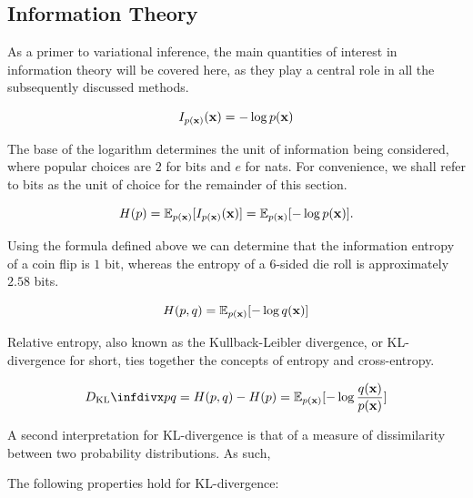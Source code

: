 \subsection{Information Theory}

As a primer to variational inference, the main quantities of interest in information theory will be covered here, as they play a central role in all the subsequently discussed methods.



$$I_{p(\mathbf{x})}(\mathbf{x}) = -\log p(\mathbf{x})$$

The base of the logarithm determines the unit of information being considered, where popular choices are $2$ for bits and $e$ for nats. For convenience, we shall refer to bits as the unit of choice for the remainder of this section.


$$H(p) = \mathbb{E}_{p(\mathbf{x})}[I_{p(\mathbf{x})}(\mathbf{x})] = \mathbb{E}_{p(\mathbf{x})}[-\log p(\mathbf{x})].$$

Using the formula defined above we can determine that the information entropy of a coin flip is $1$ bit, whereas the entropy of a 6-sided die roll is approximately $2.58$ bits.


$$H(p,q) = \mathbb{E}_{p(\mathbf{x})}[-\log q(\mathbf{x})]$$

Relative entropy, also known as the Kullback-Leibler divergence, or KL-divergence for short, ties together the concepts of entropy and cross-entropy. 


$$\dkl{p}{q} = H(p,q) - H(p) = \mathbb{E}_{p(\bx)}[-\log \frac{q(\bx)}{p(\bx)}]$$

A second interpretation for KL-divergence is that of a measure of dissimilarity between two probability distributions. As such, 

The following properties hold for KL-divergence:

